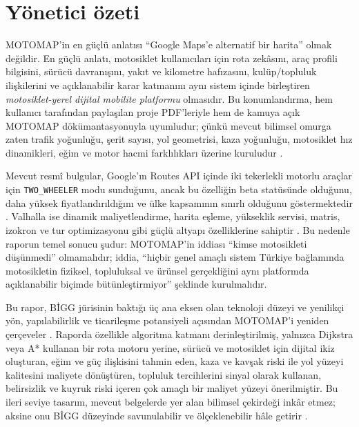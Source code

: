 \documentclass[11pt,a4paper]{article}
\begin{document}
\tableofcontents
\newpage

\section{Yönetici özeti}

MOTOMAP'in en güçlü anlatısı ``Google Maps'e alternatif bir harita'' olmak değildir. En güçlü anlatı, motosiklet kullanıcıları için rota zekâsını, araç profili bilgisini, sürücü davranışını, yakıt ve kilometre hafızasını, kulüp/topluluk ilişkilerini ve açıklanabilir karar katmanını aynı sistem içinde birleştiren \emph{motosiklet-yerel dijital mobilite platformu} olmasıdır. Bu konumlandırma, hem kullanıcı tarafından paylaşılan proje PDF'leriyle hem de kamuya açık MOTOMAP dökümantasyonuyla uyumludur; çünkü mevcut bilimsel omurga zaten trafik yoğunluğu, şerit sayısı, yol geometrisi, kaza yoğunluğu, motosiklet hız dinamikleri, eğim ve motor hacmi farklılıkları üzerine kuruludur \cite{u1,u2,g1,g2}. 

Mevcut resmî bulgular, Google'ın Routes API içinde iki tekerlekli motorlu araçlar için \texttt{TWO\_WHEELER} modu sunduğunu, ancak bu özelliğin beta statüsünde olduğunu, daha yüksek fiyatlandırıldığını ve ülke kapsamının sınırlı olduğunu göstermektedir \cite{o1,o2,o3,o4}. Valhalla ise dinamik maliyetlendirme, harita eşleme, yükseklik servisi, matris, izokron ve tur optimizasyonu gibi güçlü altyapı özelliklerine sahiptir \cite{o7,o8,o9,o10,o11,o12}. Bu nedenle raporun temel sonucu şudur: MOTOMAP'in iddiası ``kimse motosikleti düşünmedi'' olmamalıdır; iddia, ``hiçbir genel amaçlı sistem Türkiye bağlamında motosikletin fiziksel, topluluksal ve ürünsel gerçekliğini aynı platformda açıklanabilir biçimde bütünleştirmiyor'' şeklinde kurulmalıdır.

Bu rapor, BİGG jürisinin baktığı üç ana eksen olan teknoloji düzeyi ve yenilikçi yön, yapılabilirlik ve ticarileşme potansiyeli açısından MOTOMAP'i yeniden çerçeveler \cite{u3}. Raporda özellikle algoritma katmanı derinleştirilmiş, yalnızca Dijkstra veya A* kullanan bir rota motoru yerine, sürücü ve motosiklet için dijital ikiz oluşturan, eğim ve güç ilişkisini tahmin eden, kaza ve kavşak riski ile yol yüzeyi kalitesini maliyete dönüştüren, topluluk tercihlerini sinyal olarak kullanan, belirsizlik ve kuyruk riski içeren çok amaçlı bir maliyet yüzeyi önerilmiştir. Bu ileri seviye tasarım, mevcut belgelerde yer alan bilimsel çekirdeği inkâr etmez; aksine onu BİGG düzeyinde savunulabilir ve ölçeklenebilir hâle getirir \cite{u1,u2,g2,g6,o18}. 
\end{document}
